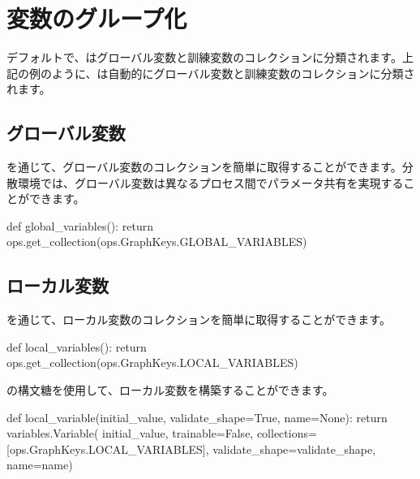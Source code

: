 \section{変数のグループ化}

\begin{content}

デフォルトで、はグローバル変数と訓練変数のコレクションに分類されます。上記の例のように、は自動的にグローバル変数と訓練変数のコレクションに分類されます。

\subsection{グローバル変数}

を通じて、グローバル変数のコレクションを簡単に取得することができます。分散環境では、グローバル変数は異なるプロセス間でパラメータ共有を実現することができます。

\begin{leftbar}
\begin{python}
def global_variables():
  return ops.get_collection(ops.GraphKeys.GLOBAL_VARIABLES)
\end{python}
\end{leftbar}

\subsection{ローカル変数}

を通じて、ローカル変数のコレクションを簡単に取得することができます。

\begin{leftbar}
\begin{python}
def local_variables():
  return ops.get_collection(ops.GraphKeys.LOCAL_VARIABLES)
\end{python}
\end{leftbar}

の構文糖を使用して、ローカル変数を構築することができます。

\begin{leftbar}
\begin{python}
def local_variable(initial_value, validate_shape=True, name=None):
  return variables.Variable(
      initial_value, trainable=False,
      collections=[ops.GraphKeys.LOCAL_VARIABLES],
      validate_shape=validate_shape, name=name)
\end{python}
\end{leftbar}


\end{content}
